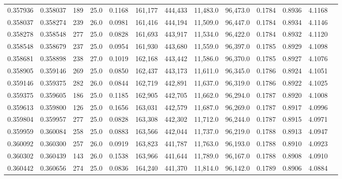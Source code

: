 \begin{tabular}{rrrrrrrrrrrrr}
0.357936 & 0.358037 &   189 & 25.0 &                                     0.1168 & 161,177 & 444,433 &  11,483.0 &  96,473.0 & 0.1784 & 0.8936 & 4.1168 \\
0.358037 & 0.358274 &   239 & 26.0 &                                     0.0981 & 161,416 & 444,194 &  11,509.0 &  96,447.0 & 0.1784 & 0.8934 & 4.1146 \\
0.358278 & 0.358548 &   277 & 25.0 &                                     0.0828 & 161,693 & 443,917 &  11,534.0 &  96,422.0 & 0.1784 & 0.8932 & 4.1120 \\
0.358548 & 0.358679 &   237 & 25.0 &                                     0.0954 & 161,930 & 443,680 &  11,559.0 &  96,397.0 & 0.1785 & 0.8929 & 4.1098 \\
0.358681 & 0.358898 &   238 & 27.0 &                                     0.1019 & 162,168 & 443,442 &  11,586.0 &  96,370.0 & 0.1785 & 0.8927 & 4.1076 \\
0.358905 & 0.359146 &   269 & 25.0 &                                     0.0850 & 162,437 & 443,173 &  11,611.0 &  96,345.0 & 0.1786 & 0.8924 & 4.1051 \\
0.359146 & 0.359375 &   282 & 26.0 &                                     0.0844 & 162,719 & 442,891 &  11,637.0 &  96,319.0 & 0.1786 & 0.8922 & 4.1025 \\
0.359375 & 0.359605 &   186 & 25.0 &                                     0.1185 & 162,905 & 442,705 &  11,662.0 &  96,294.0 & 0.1787 & 0.8920 & 4.1008 \\
0.359613 & 0.359800 &   126 & 25.0 &                                     0.1656 & 163,031 & 442,579 &  11,687.0 &  96,269.0 & 0.1787 & 0.8917 & 4.0996 \\
0.359804 & 0.359957 &   277 & 25.0 &                                     0.0828 & 163,308 & 442,302 &  11,712.0 &  96,244.0 & 0.1787 & 0.8915 & 4.0971 \\
0.359959 & 0.360084 &   258 & 25.0 &                                     0.0883 & 163,566 & 442,044 &  11,737.0 &  96,219.0 & 0.1788 & 0.8913 & 4.0947 \\
0.360092 & 0.360300 &   257 & 26.0 &                                     0.0919 & 163,823 & 441,787 &  11,763.0 &  96,193.0 & 0.1788 & 0.8910 & 4.0923 \\
0.360302 & 0.360439 &   143 & 26.0 &                                     0.1538 & 163,966 & 441,644 &  11,789.0 &  96,167.0 & 0.1788 & 0.8908 & 4.0910 \\
0.360442 & 0.360656 &   274 & 25.0 &                                     0.0836 & 164,240 & 441,370 &  11,814.0 &  96,142.0 & 0.1789 & 0.8906 & 4.0884 \\

\end{tabular}
